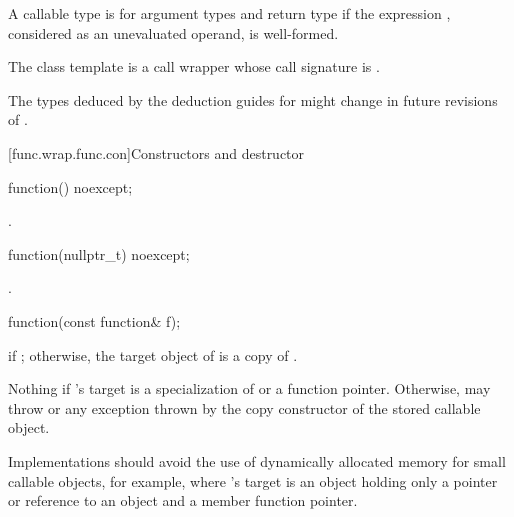 \pnum
{}%
A callable type 
is  for argument
types 
and return type 
if the expression
,
considered as an unevaluated operand, is
well-formed.

\pnum
The  class template is a call
wrapper whose call signature
is .

\pnum
\begin{note}
The types deduced by the deduction guides for 
might change in future revisions of \Cpp{}.
\end{note}

[func.wrap.func.con]{Constructors and destructor}

%
\begin{itemdecl}
function() noexcept;
\end{itemdecl}

\begin{itemdescr}
\pnum
\ensures
{}.
\end{itemdescr}

%
\begin{itemdecl}
function(nullptr_t) noexcept;
\end{itemdecl}

\begin{itemdescr}
\pnum
\ensures
{}.
\end{itemdescr}

%
\begin{itemdecl}
function(const function& f);
\end{itemdecl}

\begin{itemdescr}
\pnum
\ensures
{} if ; otherwise,
the target object of  is a copy of .

\pnum
\throws
Nothing if 's target is
a specialization of  or
a function pointer. Otherwise, may throw 
or any exception thrown by the copy constructor of the stored callable object.

\pnum
\recommended
Implementations should avoid the use of
dynamically allocated memory for small callable objects, for example, where
's target is an object holding only a pointer or reference
to an object and a member function pointer.
\end{itemdescr}

